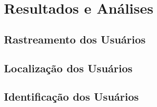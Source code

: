 \chapter{Resultados e Análises}




\section{Rastreamento dos Usuários}

\section{Localização dos Usuários}

\section{Identificação dos Usuários}













